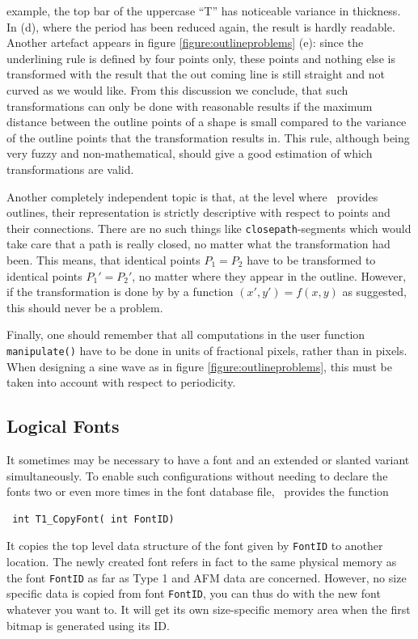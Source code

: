 example, the top bar of the uppercase ``T'' has noticeable variance in
thickness. In (d), where the period has been reduced again, the result is
hardly readable. Another artefact appears in figure
\ref{figure:outlineproblems} (e): since the underlining rule is defined by
four points only, these points and nothing else is transformed with the result
that the out coming line is still straight and not curved as we would
like. From this discussion we conclude, that such transformations can only be done
with reasonable results if the maximum distance between the outline points of
a shape is small compared to the variance of the outline points that the
transformation results in. This rule, although being very fuzzy and
non-mathematical, should give a good estimation of which transformations are valid. 

Another completely independent topic is that, at the level where \tonelib\ 
provides outlines, their representation is strictly descriptive with respect
to points and their connections. There are no such things like 
\verb+closepath+-segments which would take care that a path is really closed,
no matter what the transformation had been. This means, that identical points
$P_1 = P_2$ have to be transformed to identical points $P_1'=P_2'$, no matter
where they appear in the outline. However,
if the transformation is done by by a function $(x',y')=f(x,y)$ as suggested,
this should never be a problem.

Finally, one should remember that all computations in the user function
\verb+manipulate()+ have to be done in units of fractional pixels, rather than in
pixels. When designing a sine wave as in figure \ref{figure:outlineproblems},
this must be taken into account with respect to periodicity.

\subsection{Logical Fonts}
\label{logicalfonts}%
It sometimes may be necessary to have a font and an extended or slanted
variant simultaneously. To enable such configurations without needing to
declare the fonts two or even more times in the font database file, 
\tonelib\  provides the function 
\precorr
\begin{verbatim}
 int T1_CopyFont( int FontID)
\end{verbatim}\postcorr
It copies the top level data structure of the font given by \verb+FontID+ to
another location. The newly created font refers in fact to the same 
physical memory as the font \verb+FontID+ as far as Type 1 and AFM data are
concerned. However, no size specific data is copied from font \verb+FontID+,
you can thus do with the new font whatever you want to. It will get its own
size-specific memory area when the first bitmap is generated using its ID.

